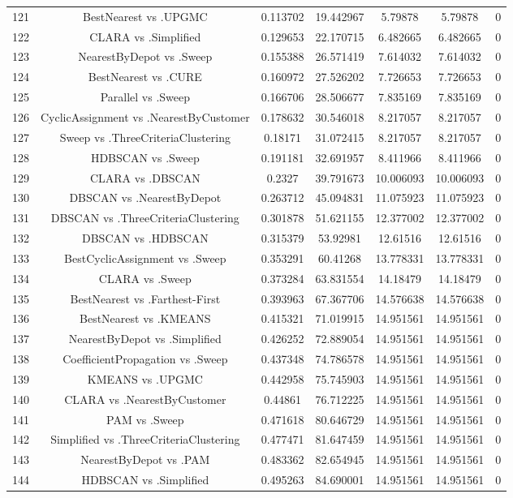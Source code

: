 \documentclass[a4paper,10pt]{article}
\begin{document}
\begin{landscape}
\begin{table}[!htp]
\begin{tabular}{ccccccc}
121&BestNearest vs .UPGMC&0.113702&19.442967&5.79878&5.79878&0\\
122&CLARA vs .Simplified&0.129653&22.170715&6.482665&6.482665&0\\
123&NearestByDepot vs .Sweep&0.155388&26.571419&7.614032&7.614032&0\\
124&BestNearest vs .CURE&0.160972&27.526202&7.726653&7.726653&0\\
125&Parallel vs .Sweep&0.166706&28.506677&7.835169&7.835169&0\\
126&CyclicAssignment vs .NearestByCustomer&0.178632&30.546018&8.217057&8.217057&0\\
127&Sweep vs .ThreeCriteriaClustering&0.18171&31.072415&8.217057&8.217057&0\\
128&HDBSCAN vs .Sweep&0.191181&32.691957&8.411966&8.411966&0\\
129&CLARA vs .DBSCAN&0.2327&39.791673&10.006093&10.006093&0\\
130&DBSCAN vs .NearestByDepot&0.263712&45.094831&11.075923&11.075923&0\\
131&DBSCAN vs .ThreeCriteriaClustering&0.301878&51.621155&12.377002&12.377002&0\\
132&DBSCAN vs .HDBSCAN&0.315379&53.92981&12.61516&12.61516&0\\
133&BestCyclicAssignment vs .Sweep&0.353291&60.41268&13.778331&13.778331&0\\
134&CLARA vs .Sweep&0.373284&63.831554&14.18479&14.18479&0\\
135&BestNearest vs .Farthest-First&0.393963&67.367706&14.576638&14.576638&0\\
136&BestNearest vs .KMEANS&0.415321&71.019915&14.951561&14.951561&0\\
137&NearestByDepot vs .Simplified&0.426252&72.889054&14.951561&14.951561&0\\
138&CoefficientPropagation vs .Sweep&0.437348&74.786578&14.951561&14.951561&0\\
139&KMEANS vs .UPGMC&0.442958&75.745903&14.951561&14.951561&0\\
140&CLARA vs .NearestByCustomer&0.44861&76.712225&14.951561&14.951561&0\\
141&PAM vs .Sweep&0.471618&80.646729&14.951561&14.951561&0\\
142&Simplified vs .ThreeCriteriaClustering&0.477471&81.647459&14.951561&14.951561&0\\
143&NearestByDepot vs .PAM&0.483362&82.654945&14.951561&14.951561&0\\
144&HDBSCAN vs .Simplified&0.495263&84.690001&14.951561&14.951561&0\\

\end{tabular}
\end{table}
\end{landscape}
\end{document}
